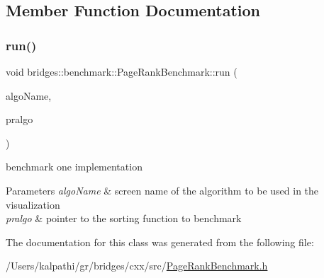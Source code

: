 \subsection{Member Function Documentation}
\mbox{\label{classbridges_1_1benchmark_1_1_page_rank_benchmark_a090873837a04f96bb0349471ffca7cfa}} 
\subsubsection{\texorpdfstring{run()}{run()}}
{\footnotesize\ttfamily void bridges\+::benchmark\+::\+Page\+Rank\+Benchmark\+::run (\begin{DoxyParamCaption}\item[{std\+::string}]{algo\+Name,  }\item[{void($\ast$)(const \mbox{\hyperlink{classbridges_1_1datastructure_1_1_graph_adj_list}{Graph\+Adj\+List}}$<$ std\+::string $>$ \&gr, std\+::unordered\+\_\+map$<$ std\+::string, double $>$ \&out)}]{pralgo }\end{DoxyParamCaption})\hspace{0.3cm}{\ttfamily [inline]}}



benchmark one implementation 


\begin{DoxyParams}{Parameters}
{\em algo\+Name} & screen name of the algorithm to be used in the visualization \\
\hline
{\em pralgo} & pointer to the sorting function to benchmark \\
\hline
\end{DoxyParams}


The documentation for this class was generated from the following file\+:\begin{DoxyCompactItemize}
\item 
/\+Users/kalpathi/gr/bridges/cxx/src/\mbox{\hyperlink{_page_rank_benchmark_8h}{Page\+Rank\+Benchmark.\+h}}\end{DoxyCompactItemize}
